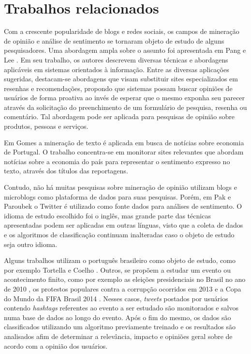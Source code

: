 \chapter{Trabalhos relacionados} \label{cap:trabalhos_relacionados}

Com a crescente popularidade de blogs e redes sociais, os campos de mineração de opinião e análise de sentimento se tornaram objeto de estudo de alguns pesquisadores. Uma abordagem ampla sobre o assunto foi apresentada em Pang e Lee \cite{pang2008opinion}. Em seu trabalho, os autores descrevem diversas técnicas e abordagens aplicáveis em sistemas orientados à informação. Entre as diversas aplicações sugeridas, destacam-se abordagens que visam substituir sites especializados em resenhas e recomendações, propondo que sistemas possam buscar opiniões de usuários de forma proativa ao invés de esperar que o mesmo exponha seu parecer através da solicitação do preenchimento de um formulário de pesquisa, resenha ou comentário. Tal abordagem pode ser aplicada para pesquisas de opinião sobre produtos, pessoas e serviços.

Em Gomes \cite{gomes2013text} a mineração de texto é aplicada em busca de notícias sobre economia de Portugal. O trabalho concentra-se em monitorar sites relevantes que abordam notícias sobre a economia do país para representar o sentimento expresso no texto, através dos títulos das reportagens.

Contudo, não há muitas pesquisas sobre mineração de opinião utilizam blogs e microblogs como plataforma de dados para suas pesquisas. Porém, em Pak e Paroubek \cite{pak2010twitter} o Twitter é utilizado como fonte dados para análises de sentimento. O idioma de estudo escolhido foi o inglês, mas grande parte das técnicas apresentadas podem ser aplicadas em outras línguas, visto que a coleta de dados e os algoritmos de classificação continuam inalteradas caso o objeto de estudo seja outro idioma.

Alguns trabalhos utilizam o português brasileiro como objeto de estudo, como por exemplo Tortella e Coelho \cite{tortellaanalise}. Outros, se propõem a estudar um evento ou acontecimento finito, como por exemplo as eleições presidenciais no Brasil no ano de 2010 \cite{rodrigues2012characterizing}, os protestos populares contra a corrupção ocorridos em 2013 \cite{franca2014analise} e a Copa do Mundo da FIFA Brasil 2014 \cite{carvalho2014mineraccao}. Nesses casos, \textit{tweets} postados por usuários contendo \textit{hashtags} referentes ao evento a ser estudado são monitorados e salvos numa base de dados ao longo do evento. Após o fim do mesmo, os dados são classificados utilizando um algoritmo previamente treinado e os resultados são analisados afim de determinar a relevância, impacto e opiniões geral sobre de acordo com a opinião dos usuários.

